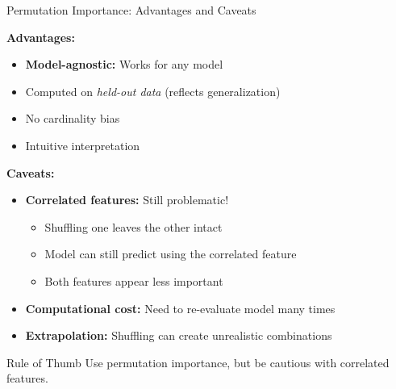 \documentclass[10pt]{beamer}
\newcommand{\highlight}[1]{\textcolor{AccentOrange}{\textbf{#1}}}
\begin{document}
\begin{frame}{Permutation Importance: Advantages and Caveats}

  \textbf{Advantages:}
  \begin{itemize}
    \item \highlight{Model-agnostic:} Works for any model
    \item Computed on \emph{held-out data} (reflects generalization)
    \item No cardinality bias
    \item Intuitive interpretation
  \end{itemize}

  \vspace{1em}
  \textbf{Caveats:}
  \begin{itemize}
    \item \textbf{Correlated features:} Still problematic!
    \begin{itemize}
      \item Shuffling one leaves the other intact
      \item Model can still predict using the correlated feature
      \item Both features appear less important
    \end{itemize}
    \item \textbf{Computational cost:} Need to re-evaluate model many times
    \item \textbf{Extrapolation:} Shuffling can create unrealistic combinations
  \end{itemize}

  \vspace{0.5em}
  \begin{block}{Rule of Thumb}
    Use permutation importance, but be cautious with correlated features.
  \end{block}
\end{frame}

\end{document}
